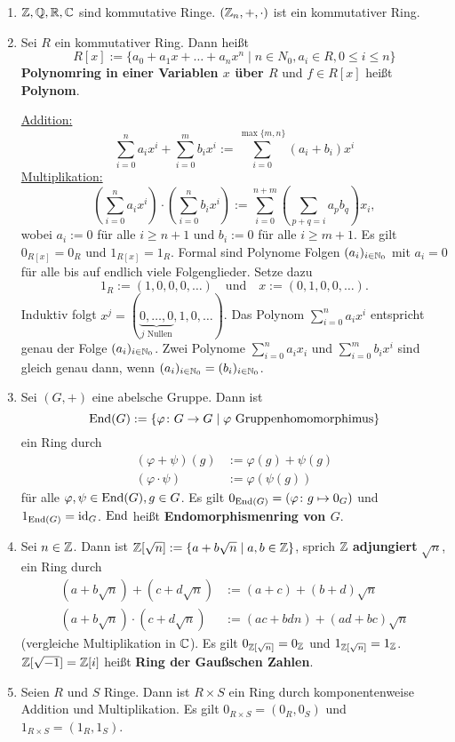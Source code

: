 \begin{beispiel}\label{beispiel4_3}
	\begin{enumerate}[label=(\arabic*)]
		\item $\mathbb{Z}, \mathbb{Q}, \mathbb{R}, \mathbb{C}$ sind kommutative Ringe. $(\mathbb{Z}_n, +, \cdot)$ ist ein kommutativer Ring.
		\item Sei $R$ ein kommutativer Ring. Dann heißt 
		\[R[x] := \{a_0 + a_1 x + \dots + a_n x^n \mid n \in N_0, a_i \in R, 0 \leq i \leq n\}\]
		\textbf{Polynomring in einer Variablen $x$ über $R$} und $f \in R[x]$ heißt \textbf{Polynom}. 
		
		\underline{Addition:} 
		\[\sum_{i=0}^n a_ix^i + \sum_{i=0}^m b_ix^i := \sum_{i=0}^{\max\{m,n\}} (a_i +b_i)x^i\]
		\underline{Multiplikation:}
		\[\left(\sum_{i=0}^n a_ix^i\right) \cdot \left(\sum_{i=0}^n b_ix^i\right) := \sum_{i=0}^{n+m} \left(\sum_{p+q = i} a_p b_q\right)x_i,\]
		wobei $a_i := 0$ für alle $i \geq n+1$ und $b_i := 0$ für alle $i \geq m+1$. Es gilt $0_{R[x]} = 0_R$ und $1_{R[x]} = 1_R$. Formal sind Polynome Folgen $(a_i)_{i \in \mathbb{N}_0}$ mit $a_i = 0$ für alle bis auf endlich viele Folgenglieder. Setze dazu 
		\[1_R := (1,0,0,0,\dots)\quad\text{und}\quad x := (0,1,0,0,\dots).\]
		Induktiv folgt $x^j = (\underbrace{0,\dots,0}_{j\text{ Nullen}}, 1, 0, \dots)$. Das Polynom $\sum_{i=0}^n a_i x^i $ entspricht genau der Folge $(a_i)_{i \in \mathbb{N}_0}$. Zwei Polynome $\sum_{i=0}^n a_i x_i$ und $\sum_{i=0}^m b_i x^i$ sind gleich genau dann, wenn $(a_i)_{i \in \mathbb{N}_0} = (b_i)_{i \in \mathbb{N}_0}$.
		\item Sei $(G,+)$ eine abelsche Gruppe. Dann ist 
		\[\mathrm{End}(G) := \{\varphi \colon G \to G \mid \varphi \text{ Gruppenhomomorphimus}\}\]
		ein Ring durch 
		\begin{align*}
			(\varphi + \psi)(g) &:= \varphi(g) + \psi(g)\\
			(\varphi \cdot \psi) &:= \varphi(\psi(g))
		\end{align*}
		für alle $\varphi, \psi \in \mathrm{End}(G), g \in G$. Es gilt $0_{\mathrm{End}(G)} = (\varphi\colon g \mapsto 0_G)$ und $1_{\mathrm{End}(G)} = \mathrm{id}_G$. $\mathrm{End}$ heißt \textbf{Endomorphismenring von $G$}. 
		\item Sei $n \in \mathbb{Z}$. Dann ist $\mathbb{Z}[\sqrt{n}] := \{a + b \sqrt{n} \mid a,b \in \mathbb{Z}\}$, sprich $\mathbb{Z}$ \textbf{adjungiert} $\sqrt{n}$, ein Ring durch
		\begin{align*}
			(a + b \sqrt{n}) + (c + d \sqrt{n}) &:= (a+c) + (b+d)\sqrt{n}\\
			(a + b \sqrt{n}) \cdot (c + d \sqrt{n}) &:= (ac + bdn) + (ad + bc)\sqrt{n}
		\end{align*}
		(vergleiche Multiplikation in $\mathbb{C}$). Es gilt $0_{\mathbb{Z}[\sqrt{n}]} = 0_{\mathbb{Z}}$ und $1_{\mathbb{Z}[\sqrt{n}]} = 1_{\mathbb{Z}}$. $\mathbb{Z}[\sqrt{-1}] = \mathbb{Z}[i]$ heißt \textbf{Ring der Gaußschen Zahlen}.
		\item Seien $R$ und $S$ Ringe. Dann ist $R \times S$ ein Ring durch komponentenweise Addition und Multiplikation. Es gilt $0_{R \times S} = (0_R, 0_S)$ und $1_{R \times S} = (1_R, 1_S)$.
	\end{enumerate}
\end{beispiel}
